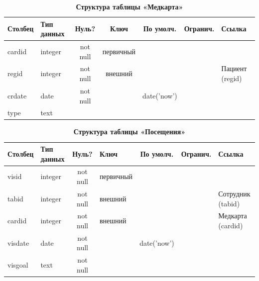 \documentclass[14pt,a4paper,russian]{extreport}
\begin{document}
\begin{table}[h!]
    \caption{ } 
    \begin{subtable}[t]{\textwidth}
        \caption{\textbf{Структура таблицы «Медкарта»}}
    \begin{tabularx}{\textwidth}{| X | X | c | c | c | c | X |}
        \hline
        \textbf{Столбец} & \textbf{Тип данных} & \textbf{Нуль?} & \textbf{Ключ} & \textbf{По
        умолч.} & \textbf{Огранич.} & \textbf{Ссылка} \\ \hline
        cardid & integer & not null & первичный & & & \\ \hline
        regid & integer & not null & внешний & & & Пациент (regid) \\ \hline
        crdate & date & not null & & date('now') & & \\ \hline
        type & text & & & & & \\ \hline
    \end{tabularx}
    \end{subtable}
    \label{table:medcard}
\end{table}


\begin{table}[h!]
    \caption{ }
    \begin{subtable}[t]{\textwidth}
        \caption{\textbf{Структура таблицы «Посещения»}}
    \begin{tabularx}{\textwidth}{| X | X | c | X | c | c | X |}
        \hline
        \textbf{Столбец} & \textbf{Тип данных} & \textbf{Нуль?} & \textbf{Ключ} & \textbf{По умолч.} & \textbf{Огранич.} & \textbf{Ссылка} \\ \hline
            visid & integer & not null & первичный & & & \\ \hline
            tabid & integer & not null & внешний & & & Сотрудник (tabid) \\ \hline
            cardid & integer & not null & внешний & & & Медкарта (cardid)\\ \hline
            visdate & date & not null &  & date('now') & & \\ \hline
            visgoal & text & not null & & & & \\ \hline
    \end{tabularx}
    \end{subtable}
    \label{table:visit}
\end{table}
\end{document}
